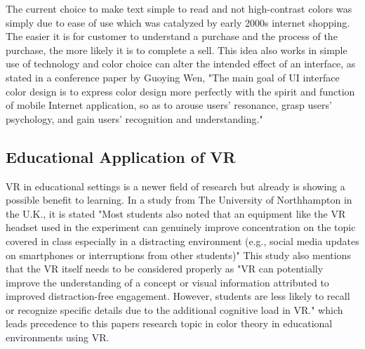 \documentclass[acmlarge]{acmart}
\begin{document}
The current choice to make text simple to read and not high-contrast colors was simply due to ease of use which was catalyzed by early 2000s internet shopping. The easier it is for
customer to understand a purchase and the process of the purchase, the more likely it is to complete a sell. This idea also works in simple use of technology and color choice can
alter the intended effect of an interface, as stated in a conference paper by Guoying Wen, "The main goal of UI interface color design is to express color design more perfectly with the spirit and function of mobile Internet 
application, so as to arouse users' resonance, grasp users' psychology, and gain users' recognition and understanding." \cite{wen2021color}

\subsection{Educational Application of VR}
VR in educational settings is a newer field of research but already is showing a possible benefit to learning. In a study from  The University of Northhampton in the U.K.,
it is stated "Most students also noted that an equipment like the VR headset used in the experiment can genuinely improve concentration on the topic covered in class especially in a distracting environment
(e.g., social media updates on smartphones or interruptions from other students)" \cite{slavova2018comparative} This study also mentions that the VR itself 
needs to be considered properly as "VR can potentially improve the understanding of a concept or visual information attributed to improved distraction-free engagement. However, students are less likely 
to recall or recognize specific details due to the additional cognitive load in VR." \cite{slavova2018comparative} which leads precedence to this papers research topic in color theory
in educational environments using VR.
\end{document}
